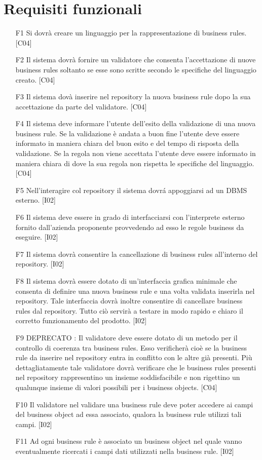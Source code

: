 \documentclass[11pt,titlepage,a4paper]{report}
\begin{document}
\section{Requisiti funzionali}
\begin{itemize}
\item[F1]{Si dovr\`a creare un linguaggio per la rappresentazione di business rules. [C04]}
\item[F2]{Il sistema dovr\`a fornire un validatore che consenta l'accettazione di nuove business rules soltanto se esse sono scritte secondo le specifiche del linguaggio creato. [C04]}
\item[F3]{Il sistema dov\`a inserire nel repository la nuova business rule dopo la sua accettazione da parte del validatore. [C04]}
\item[F4]{Il sistema deve informare l'utente dell'esito della validazione di una nuova business rule. Se la validazione \`e andata a buon fine l'utente deve essere informato in maniera chiara del buon esito e del tempo di risposta della validazione. Se la regola non viene accettata l'utente deve essere informato in maniera chiara di dove la sua regola non rispetta le specifiche del linguaggio. [C04]}
\item[F5]{Nell'interagire col repository il sistema dovr\'a appoggiarsi ad un DBMS esterno. [I02]}
\item[F6]{Il sistema deve essere in grado di interfacciarsi con l'interprete esterno fornito dall'azienda proponente provvedendo ad esso le regole business da eseguire. [I02]}
\item[F7]{Il sistema dovr\`a consentire la cancellazione di business rules all'interno del repository. [I02]}
\item[F8]{Il sistema dovr\`a essere dotato di un'interfaccia grafica minimale che consenta di definire una nuova business rule e una volta validata inserirla nel repository. Tale interfaccia dovr\`a inoltre consentire di cancellare business rules dal repository. Tutto ci\`o servir\`a a testare in modo rapido e chiaro il corretto funzionamento del prodotto. [I02]}
\item[F9]{ DEPRECATO : Il validatore deve essere dotato di un metodo per il controllo di coerenza tra business rules. Esso verificher\`a cio\`e se la business rule da inserire nel repository entra in conflitto con le altre gi\`a presenti. Pi\`u dettagliatamente tale validatore dovr\`a verificare che le business rules presenti nel repository rappresentino un insieme soddisfacibile e non rigettino un qualunque insieme di valori possibili per i business objects. [C04]}
\item[F10]{Il validatore nel validare una business rule deve poter accedere ai campi del business object ad essa associato, qualora la business rule utilizzi tali campi. [I02]}
\item[F11]{Ad ogni business rule \`e associato un business object nel quale vanno eventualmente ricercati i campi dati utilizzati nella business rule. [I02]}
\end{itemize}
\end{document}
